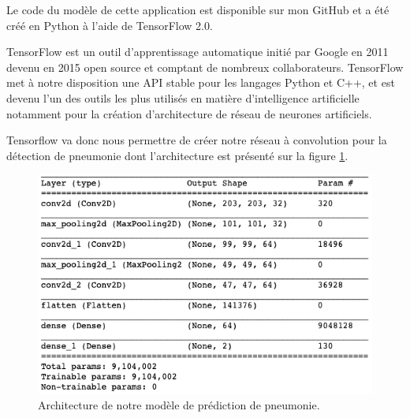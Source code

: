 Le code du modèle de cette application est disponible sur mon GitHub \cite{pneumoniaDepot} et a été créé en Python à l'aide de TensorFlow 2.0.\par
TensorFlow\cite{tensorflowDepot} est un outil d'apprentissage automatique initié par Google en 2011 devenu en 2015 open source et comptant de nombreux collaborateurs. TensorFlow met à notre disposition une API stable pour les langages Python et C++, et est devenu l'un des outils les plus utilisés en matière d'intelligence artificielle notamment pour la création d'architecture de réseau de neurones artificiels.\par
Tensorflow va donc nous permettre de créer notre réseau à convolution pour la détection de pneumonie dont l'architecture est présenté sur la figure \ref{CNNPneumoniaArchi}.\par
\begin{figure}[h]
    \includegraphics[scale=0.6]{src_img/CNN_pneumonia_archi.png}
    \caption{Architecture de notre modèle de prédiction de pneumonie.}
    \label{CNNPneumoniaArchi}
\end{figure}
